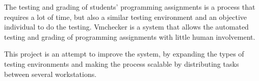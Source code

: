
The testing and grading of students' programming assignments is a process 
that requires a lot of time, but also a similar testing environment and 
an objective individual to do the testing.
Vmchecker is a system that allows the automated testing and grading of 
programming assignments with little human involvement.

This project is an attempt to improve the system, by expanding the types of
testing environments and making the process scalable by distributing tasks 
between several workstations.

